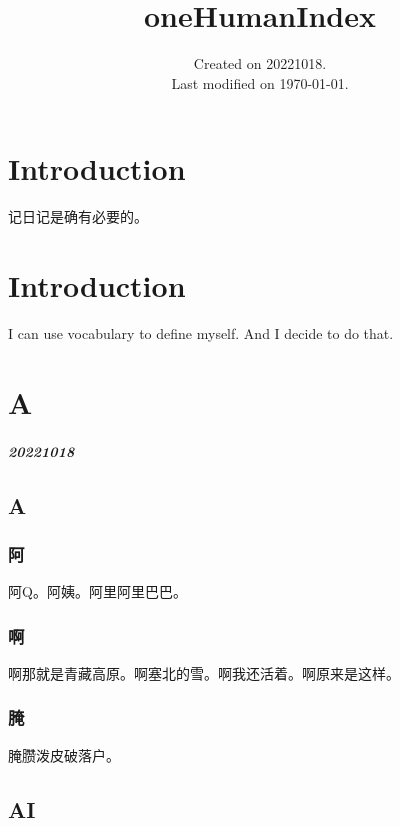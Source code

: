 \documentclass[UTF8]{oneHumanIndex}
\begin{document}
\title{oneHumanIndex}
\date{Created on 20221018.\\   Last modified on \today.}
\maketitle
\tableofcontents



\chapter{Introduction}

记日记是确有必要的。

\chapter{Introduction}

I can use vocabulary to define myself. And I decide to do that.

\chapter{A}

\paragraph{20221018}

\section{A}

\subsection{阿}
阿Q。阿姨。阿里阿里巴巴。

\subsection{啊}
啊那就是青藏高原。啊塞北的雪。啊我还活着。啊原来是这样。

\subsection{腌}
腌臜泼皮破落户。

\section{AI}
\end{document}
